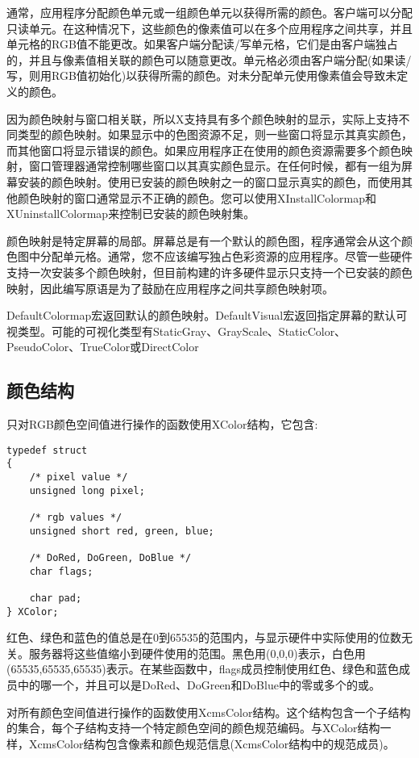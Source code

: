 通常，应用程序分配颜色单元或一组颜色单元以获得所需的颜色。客户端可以分配只读单元。在这种情况下，这些颜色的像素值可以在多个应用程序之间共享，并且单元格的RGB值不能更改。如果客户端分配读/写单元格，它们是由客户端独占的，并且与像素值相关联的颜色可以随意更改。单元格必须由客户端分配(如果读/写，则用RGB值初始化)以获得所需的颜色。对未分配单元使用像素值会导致未定义的颜色。

因为颜色映射与窗口相关联，所以X支持具有多个颜色映射的显示，实际上支持不同类型的颜色映射。如果显示中的色图资源不足，则一些窗口将显示其真实颜色，而其他窗口将显示错误的颜色。如果应用程序正在使用的颜色资源需要多个颜色映射，窗口管理器通常控制哪些窗口以其真实颜色显示。在任何时候，都有一组为屏幕安装的颜色映射。使用已安装的颜色映射之一的窗口显示真实的颜色，而使用其他颜色映射的窗口通常显示不正确的颜色。您可以使用XInstallColormap和XUninstallColormap来控制已安装的颜色映射集。

颜色映射是特定屏幕的局部。屏幕总是有一个默认的颜色图，程序通常会从这个颜色图中分配单元格。通常，您不应该编写独占色彩资源的应用程序。尽管一些硬件支持一次安装多个颜色映射，但目前构建的许多硬件显示只支持一个已安装的颜色映射，因此编写原语是为了鼓励在应用程序之间共享颜色映射项。

DefaultColormap宏返回默认的颜色映射。DefaultVisual宏返回指定屏幕的默认可视类型。可能的可视化类型有StaticGray、GrayScale、StaticColor、PseudoColor、TrueColor或DirectColor


\subsection{颜色结构}

只对RGB颜色空间值进行操作的函数使用XColor结构，它包含:

\begin{lstlisting}
typedef struct
{
	/* pixel value */
	unsigned long pixel;
		
	/* rgb values */
	unsigned short red, green, blue;
	
	/* DoRed, DoGreen, DoBlue */
	char flags;
	
	char pad;
} XColor;
\end{lstlisting}

红色、绿色和蓝色的值总是在0到65535的范围内，与显示硬件中实际使用的位数无关。服务器将这些值缩小到硬件使用的范围。黑色用(0,0,0)表示，白色用(65535,65535,65535)表示。在某些函数中，flags成员控制使用红色、绿色和蓝色成员中的哪一个，并且可以是DoRed、DoGreen和DoBlue中的零或多个的或。

对所有颜色空间值进行操作的函数使用XcmsColor结构。这个结构包含一个子结构的集合，每个子结构支持一个特定颜色空间的颜色规范编码。与XColor结构一样，XcmsColor结构包含像素和颜色规范信息(XcmsColor结构中的规范成员)。

